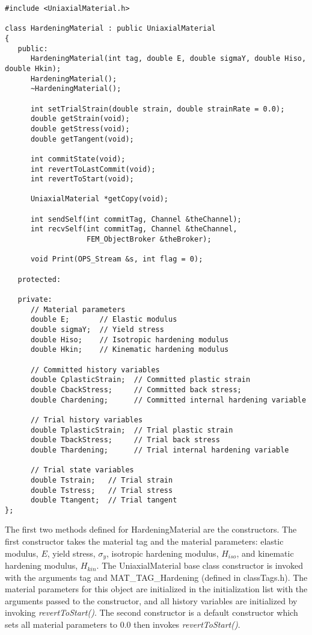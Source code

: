 \documentclass[12pt]{article}
\begin{document}
{\sf\small
\begin{verbatim}
#include <UniaxialMaterial.h>

class HardeningMaterial : public UniaxialMaterial
{
   public:
      HardeningMaterial(int tag, double E, double sigmaY, double Hiso, double Hkin);
      HardeningMaterial();
      ~HardeningMaterial();

      int setTrialStrain(double strain, double strainRate = 0.0); 
      double getStrain(void);          
      double getStress(void);
      double getTangent(void);

      int commitState(void);
      int revertToLastCommit(void);    
      int revertToStart(void);        

      UniaxialMaterial *getCopy(void);
    
      int sendSelf(int commitTag, Channel &theChannel);  
      int recvSelf(int commitTag, Channel &theChannel, 
                   FEM_ObjectBroker &theBroker);    
    
      void Print(OPS_Stream &s, int flag = 0);
    
   protected:
    
   private:
      // Material parameters
      double E;       // Elastic modulus
      double sigmaY;  // Yield stress
      double Hiso;    // Isotropic hardening modulus
      double Hkin;    // Kinematic hardening modulus

      // Committed history variables
      double CplasticStrain;  // Committed plastic strain
      double CbackStress;     // Committed back stress;
      double Chardening;      // Committed internal hardening variable

      // Trial history variables
      double TplasticStrain;  // Trial plastic strain
      double TbackStress;     // Trial back stress
      double Thardening;      // Trial internal hardening variable

      // Trial state variables
      double Tstrain;   // Trial strain
      double Tstress;   // Trial stress
      double Ttangent;  // Trial tangent
};
\end{verbatim}
}

\noindent The first two methods defined for HardeningMaterial are the constructors. The
first constructor takes the material tag and the material parameters: elastic modulus,
$E$, yield stress, $\sigma_y$, isotropic hardening modulus, $H_{iso}$, and kinematic
hardening modulus, $H_{kin}$. The UniaxialMaterial
base class constructor is invoked with the arguments tag and MAT\_TAG\_Hardening (defined
in classTags.h). The material parameters for this object are initialized in
the initialization list with the arguments passed to the constructor, and all
history variables are initialized by invoking {\em revertToStart()}.
The second constructor is a default constructor which sets all
material parameters to $0.0$ then invokes {\em revertToStart()}.
\end{document}
